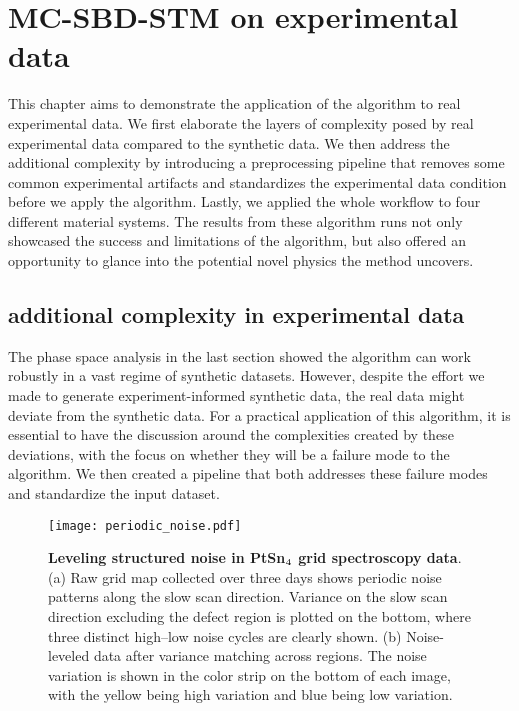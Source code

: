 \chapter{MC-SBD-STM on experimental data}
This chapter aims to demonstrate the application of the algorithm to real experimental data. We first elaborate the layers of complexity posed by real experimental data compared to the synthetic data. We then address the additional complexity by introducing a preprocessing pipeline that removes some common experimental artifacts and standardizes the experimental data condition before we apply the algorithm. Lastly, we applied the whole workflow to four different material systems. The results from these algorithm runs not only showcased the success and limitations of the algorithm, but also offered an opportunity to glance into the potential novel physics the method uncovers. 

\section{additional complexity in experimental data}
The phase space analysis in the last section showed the algorithm can work robustly in a vast regime of synthetic datasets. However, despite the effort we made to generate experiment-informed synthetic data, the real data might deviate from the synthetic data. For a practical application of this algorithm, it is essential to have the discussion around the complexities created by these deviations, with the focus on whether they will be a failure mode to the algorithm. We then created a pipeline that both addresses these failure modes and standardize the input dataset.

\begin{figure}
	\texttt{[image: periodic\_noise.pdf]} 
	\centering
	\caption[\textbf{Leveling structured noise in PtSn$\textsubscript{4}$ grid spectroscopy data}]{\textbf{Leveling structured noise in PtSn$\textsubscript{4}$ grid spectroscopy data}. (a) Raw grid map collected over three days shows periodic noise patterns along the slow scan direction. Variance on the slow scan direction excluding the defect region is plotted on the bottom, where three distinct high–low noise cycles are clearly shown. (b) Noise-leveled data after variance matching across regions. The noise variation is shown in the color strip on the bottom of each image, with the yellow being high variation and blue being low variation.}
	\label{fig:periodic_noise}
\end{figure}

